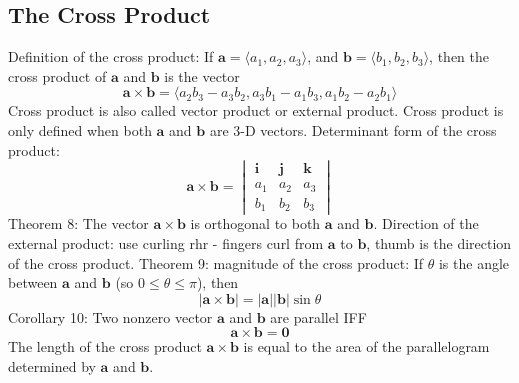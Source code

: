 \documentclass{article}
\begin{document}
    \subsection{The Cross Product}
    \begin{outline}
        \1 Definition of the cross product: If \(\mathbf a=\langle a_1,a_2,a_3\rangle\), and \(\mathbf b=\langle b_1,b_2,b_3\rangle\), then the cross product of \(\mathbf a\) and \(\mathbf b\) is the vector \[\mathbf{a\times b}=\langle a_2b_3-a_3b_2,a_3b_1-a_1b_3,a_1b_2-a_2b_1\rangle\]
        \1 Cross product is also called vector product or external product. 
        \1 Cross product is only defined when both \(\mathbf a\) and \(\mathbf b\) are 3-D vectors. 
        \1 Determinant form of the cross product: \[\mathbf{a\times b}=\begin{vmatrix}
            \mathbf i & \mathbf j & \mathbf k\\
            a_1 & a_2 & a_3\\
            b_1 & b_2 & b_3
        \end{vmatrix}\]
        \1 Theorem 8: The vector \(\mathbf{a\times b}\) is orthogonal to both \(\mathbf a\) and \(\mathbf b\). 
        \1 Direction of the external product: use curling rhr - fingers curl from \(\mathbf a\) to \(\mathbf b\), thumb is the direction of the cross product. 
        \1 Theorem 9: magnitude of the cross product: If \(\theta\) is the angle between \(\mathbf a\) and \(\mathbf b\) (so \(0\leq\theta\leq\pi\)), then \[|\mathbf{a\times b}|=|\mathbf a||\mathbf b|\sin\theta\]
        \1 Corollary 10: Two nonzero vector \(\mathbf a\) and \(\mathbf b\) are parallel IFF \[\mathbf{a\times b}=\mathbf 0\]
        \1 The length of the cross product \(\mathbf{a\times b}\) is equal to the area of the parallelogram determined by \(\mathbf a\) and \(\mathbf b\). 
    \end{outline}
\end{document}
